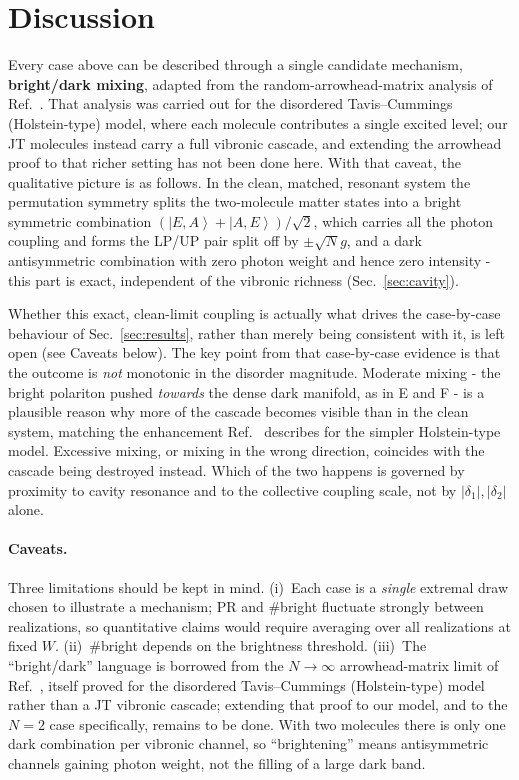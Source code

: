 \documentclass[12pt,a4paper]{article}
\newcommand{\ket}[1]{\left|#1\right\rangle}
\newcommand{\PR}{\mathrm{PR}}
\begin{document}
\section{Discussion}\label{sec:discussion}

Every case above can be described through a single candidate mechanism,
\textbf{bright/dark mixing}, adapted from the random-arrowhead-matrix analysis
of Ref.~\cite{Dubail2021}. That analysis was carried out for the disordered
Tavis--Cummings (Holstein-type) model, where each molecule contributes a
single excited level; our JT molecules instead carry a full vibronic cascade,
and extending the arrowhead proof to that richer setting has not been done
here. With that caveat, the qualitative picture is as follows. In the clean,
matched, resonant system the permutation symmetry splits the two-molecule
matter states into a bright symmetric combination
$(\ket{E,A}+\ket{A,E})/\sqrt2$, which carries all the photon coupling and
forms the LP/UP pair split off by $\pm\sqrt N g$, and a dark antisymmetric
combination with zero photon weight and hence zero intensity - this part is
exact, independent of the vibronic richness (Sec.~\ref{sec:cavity}).

Whether this exact, clean-limit coupling is actually what drives the
case-by-case behaviour of Sec.~\ref{sec:results}, rather than merely being
consistent with it, is left open (see Caveats below). The key point from that
case-by-case evidence is that
the outcome is \emph{not} monotonic in the disorder magnitude. Moderate mixing
- the bright polariton pushed \emph{towards} the dense dark manifold, as in
E and F - is a plausible reason why more of the cascade becomes visible than
in the clean system, matching the enhancement Ref.~\cite{Wellnitz2022}
describes for the simpler Holstein-type model. Excessive mixing, or mixing in
the wrong direction, coincides with the cascade being destroyed instead.
Which of the two happens is governed by
proximity to cavity resonance and to the collective coupling scale, not by
$|\delta_1|,|\delta_2|$ alone.

\paragraph{Caveats.} Three limitations should be kept in mind. (i)~Each case is
a \emph{single} extremal draw chosen to illustrate a mechanism; $\PR$ and
\#bright fluctuate strongly between realizations, so quantitative claims would
require averaging over all realizations at fixed $W$. (ii)~\#bright depends on
the brightness threshold. (iii)~The
``bright/dark'' language is borrowed from the $N\to\infty$ arrowhead-matrix
limit of Ref.~\cite{Dubail2021}, itself proved for the disordered
Tavis--Cummings (Holstein-type) model rather than a JT vibronic cascade;
extending that proof to our model, and to the $N=2$ case specifically, remains
to be done. With two molecules there is only one dark combination per
vibronic channel, so ``brightening'' means antisymmetric channels gaining
photon weight, not the filling of a large dark band.
\end{document}

